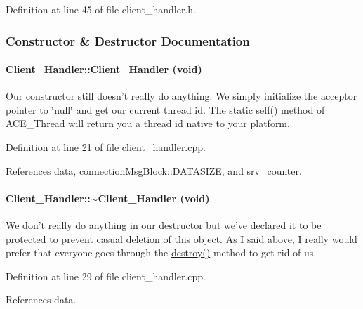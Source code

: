 Definition at line 45 of file client\_\-handler.h.

\subsubsection{Constructor \& Destructor Documentation}
\hypertarget{classClient__Handler_Client__Handlera0}{
\paragraph[Client\_\-Handler]{\setlength{\rightskip}{0pt plus 5cm}Client\_\-Handler::Client\_\-Handler (void)}\hfill}
\label{classClient__Handler_Client__Handlera0}


Our constructor still doesn't really do anything. We simply initialize the acceptor pointer to \char`\"{}null\char`\"{} and get our current thread id. The static self() method of ACE\_\-Thread will return you a thread id native to your platform. 

Definition at line 21 of file client\_\-handler.cpp.

References data, connection\-Msg\-Block::DATASIZE, and srv\_\-counter.\hypertarget{classClient__Handler_Client__Handlerb2}{
\paragraph[$\sim$Client\_\-Handler]{\setlength{\rightskip}{0pt plus 5cm}Client\_\-Handler::$\sim$Client\_\-Handler (void)}\hfill}
\label{classClient__Handler_Client__Handlerb2}


We don't really do anything in our destructor but we've declared it to be protected to prevent casual deletion of this object. As I said above, I really would prefer that everyone goes through the \hyperlink{classClient__Handler_Client__Handlera1}{destroy()} method to get rid of us. 

Definition at line 29 of file client\_\-handler.cpp.

References data.


